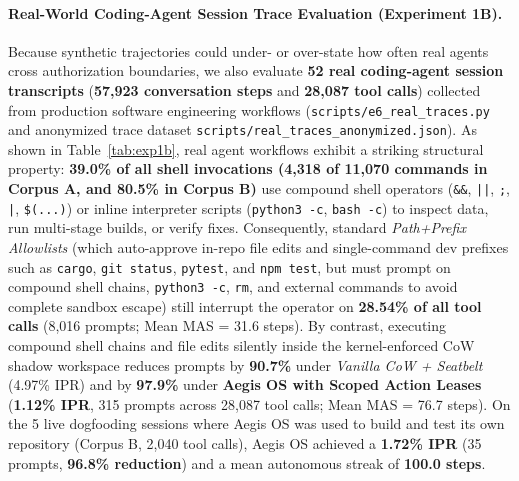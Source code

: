 \documentclass[10pt,twocolumn]{article}
\begin{document}
\paragraph{Real-World Coding-Agent Session Trace Evaluation (Experiment 1B).} Because synthetic trajectories could under- or over-state how often real agents cross authorization boundaries, we also evaluate \textbf{52 real coding-agent session transcripts} (\textbf{57,923 conversation steps} and \textbf{28,087 tool calls}) collected from production software engineering workflows (\texttt{scripts/e6\_real\_traces.py} and anonymized trace dataset \texttt{scripts/real\_traces\_anonymized.json}). As shown in Table~\ref{tab:exp1b}, real agent workflows exhibit a striking structural property: \textbf{39.0\% of all shell invocations (4,318 of 11,070 commands in Corpus A, and 80.5\% in Corpus B)} use compound shell operators (\texttt{\&\&}, \texttt{||}, \texttt{;}, \texttt{|}, \texttt{\$(...)}) or inline interpreter scripts (\texttt{python3 -c}, \texttt{bash -c}) to inspect data, run multi-stage builds, or verify fixes. Consequently, standard \emph{Path+Prefix Allowlists} (which auto-approve in-repo file edits and single-command dev prefixes such as \texttt{cargo}, \texttt{git status}, \texttt{pytest}, and \texttt{npm test}, but must prompt on compound shell chains, \texttt{python3 -c}, \texttt{rm}, and external commands to avoid complete sandbox escape) still interrupt the operator on \textbf{28.54\% of all tool calls} (8,016 prompts; Mean MAS = 31.6 steps). By contrast, executing compound shell chains and file edits silently inside the kernel-enforced CoW shadow workspace reduces prompts by \textbf{90.7\%} under \emph{Vanilla CoW + Seatbelt} (4.97\% IPR) and by \textbf{97.9\%} under \textbf{Aegis OS with Scoped Action Leases} (\textbf{1.12\% IPR}, 315 prompts across 28,087 tool calls; Mean MAS = 76.7 steps). On the 5 live dogfooding sessions where Aegis OS was used to build and test its own repository (Corpus B, 2,040 tool calls), Aegis OS achieved a \textbf{1.72\% IPR} (35 prompts, \textbf{96.8\% reduction}) and a mean autonomous streak of \textbf{100.0 steps}.
\end{document}
